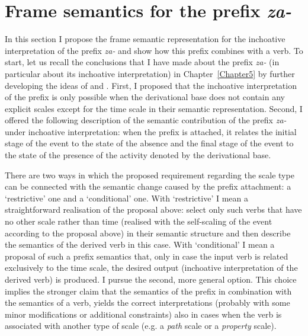 \section{Frame semantics for the prefix \textit{za-}}\label{section:frame:za}
In this section I propose the frame semantic representation for the inchoative interpretation of the prefix \textit{za-} and show how this prefix combines with a verb. To start, let us recall the conclusions that I have made about the prefix \textit{za-} (in particular about its inchoative interpretation) in Chapter~\ref{Chapter5} by further developing the ideas of \citet{Braginsky:08} and \citet{Kagan:book}. First, I proposed that the inchoative interpretation of the prefix is only possible when the derivational base does not contain any explicit scales except for the time scale in their semantic representation. Second, I offered the following description of the semantic contribution of the prefix \textit{za-} under inchoative interpretation: when the prefix is attached, it relates the initial stage of the event to the state of the absence and the final stage of the event to the state of the presence of the activity denoted by the derivational base.

There are two ways in which the proposed requirement regarding the scale type can be connected with the semantic change caused by the prefix attachment: a `restrictive' one and a `conditional' one. With `restrictive' I mean a straightforward realisation of the proposal above: select only such verbs that have no other scale rather than time (realised with the self-scaling of the event according to the proposal above) in their semantic structure and then describe the semantics of the derived verb in this case. With `conditional' I mean a proposal of such a prefix semantics that, only in case the input verb is related exclusively to the time scale, the desired output (inchoative interpretation of the derived verb) is produced. I pursue the second, more general option. This choice implies the stronger claim that the semantics of the prefix in combination with the semantics of a verb, yields the correct interpretations (probably with some minor modifications or additional constraints) also in cases when the verb is associated with another type of scale (e.g. a \textit{path} scale or a \textit{property} scale). 

